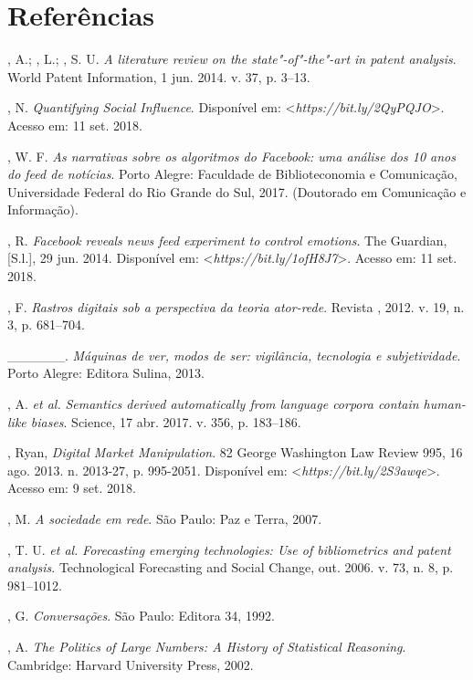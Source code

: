 \section{Referências}

\begin{Parskip}
, A.; , L.; , S. U. \emph{A literature review on the
state"-of"-the"-art in patent analysis}. World Patent Information, 1 jun.
2014. v. 37, p. 3--13.

, N. \emph{Quantifying Social Influence}. Disponível em:
\textless{}\emph{https://bit.ly/2QyPQJO}\textgreater{}. Acesso em: 11 set. 2018.

, W. F. \emph{As narrativas sobre os algoritmos do Facebook: uma
análise dos 10 anos do feed de notícias}. Porto Alegre: Faculdade de
Biblioteconomia e Comunicação, Universidade Federal do Rio Grande do
Sul, 2017. (Doutorado em Comunicação e Informação).

, R. \emph{Facebook reveals news feed experiment to control
emotions}. The Guardian, [S.l.], 29 jun. 2014. Disponível em:
\textless{}\emph{https://bit.ly/1ofH8J7}\textgreater{}. Acesso em: 11 set. 2018.

, F. \emph{Rastros digitais sob a perspectiva da teoria
ator-rede}. Revista , 2012. v. 19, n. 3, p. 681--704.

\_\_\_\_\_\_. \emph{Máquinas de ver, modos de ser: vigilância,
tecnologia e subjetividade}. Porto Alegre: Editora Sulina, 2013.

, A. \emph{et al.} \emph{Semantics derived automatically from
language corpora contain human-like biases}. Science, 17 abr. 2017. v.
356, p. 183--186.

, Ryan, \emph{Digital Market Manipulation}. 82 George Washington
Law Review 995, 16 ago. 2013. n. 2013-27, p. 995-2051. Disponível em:
\textless{}\emph{https://bit.ly/2S3awqe}\textgreater{}. Acesso em: 9 set. 2018.

, M. \emph{A sociedade em rede}. São Paulo: Paz e Terra, 2007.

, T. U. \emph{et al.} \emph{Forecasting emerging technologies: Use
of bibliometrics and patent analysis}. Technological Forecasting and
Social Change, out. 2006. v. 73, n. 8, p. 981--1012.

, G. \emph{Conversações}. São Paulo: Editora 34, 1992.

, A. \emph{The Politics of Large Numbers: A History of
Statistical Reasoning}. Cambridge: Harvard University Press, 2002.


\end{Parskip}
